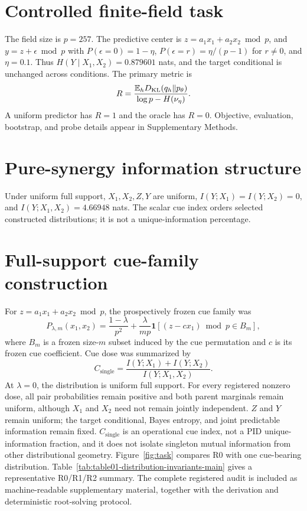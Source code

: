 \documentclass{article}
\begin{document}
\section{Controlled finite-field task}
The field size is $p=257$. The predictive center is
$z=a_1x_1+a_2x_2 \bmod p$, and $y=z+\epsilon \bmod p$ with
$P(\epsilon=0)=1-\eta$, $P(\epsilon=r)=\eta/(p-1)$ for $r\ne0$, and
$\eta=0.1$. Thus $H(Y\mid X_1,X_2)=0.879601$ nats, and the
target conditional is unchanged across conditions. The primary metric is
\[
R=\frac{\mathbb{E}_h D_{\rm KL}(q_h\Vert p_\theta)}
{\log p-H(\nu_\eta)}.
\]
A uniform predictor has $R=1$ and the oracle has $R=0$. Objective,
evaluation, bootstrap, and probe details appear in Supplementary Methods.

\section{Pure-synergy information structure}
Under uniform full support, $X_1,X_2,Z,Y$ are uniform,
$I(Y;X_1)=I(Y;X_2)=0$, and
$I(Y;X_1,X_2)=4.66948$ nats. The scalar cue index orders
selected constructed distributions; it is not a unique-information percentage.

\section{Full-support cue-family construction}
For $z=a_1x_1+a_2x_2 \bmod p$, the prospectively frozen cue family was
\[
P_{\lambda,m}(x_1,x_2)
=\frac{1-\lambda}{p^2}
+\frac{\lambda}{mp}
\mathbf{1}\!\left[(z-cx_1)\bmod p\in B_m\right],
\]
where $B_m$ is a frozen size-$m$ subset induced by the cue permutation and
$c$ is its frozen cue coefficient. Cue dose was summarized by
\[
C_{\mathrm{single}}
=\frac{I(Y;X_1)+I(Y;X_2)}{I(Y;X_1,X_2)}.
\]
At $\lambda=0$, the distribution is uniform full support. For every
registered nonzero dose, all pair probabilities remain positive and both
parent marginals remain uniform, although $X_1$ and $X_2$ need not remain
jointly independent. $Z$ and $Y$ remain uniform; the target conditional,
Bayes entropy, and joint predictable information remain fixed.
$C_{\mathrm{single}}$ is an operational cue index, not a PID
unique-information fraction, and it does not isolate singleton mutual
information from other distributional geometry. Figure~\ref{fig:task}
compares R0 with one cue-bearing distribution.
Table~\ref{tab:table01-distribution-invariants-main} gives a representative
R0/R1/R2 summary. The complete registered audit is included as
machine-readable supplementary material, together with the derivation and
deterministic root-solving protocol.
\end{document}
